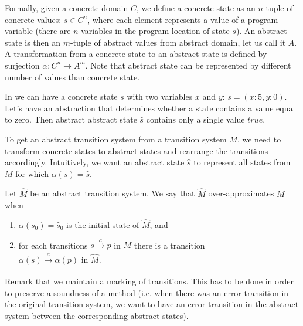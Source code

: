 Formally, given a concrete domain $C$, we define a concrete state as an $n$-tuple of concrete values:
$s \in C^n$, where each element represents a value of a program variable (there
are $n$ variables in the program location of state $s$). An abstract state is
then an $m$-tuple of abstract values from abstract domain, let us call it $A$. A
transformation from a concrete state to an abstract state is defined by
surjection $\alpha \colon C^n \rightarrow A^m$.  Note that abstract state can be
represented by different number of values than concrete state.
\begin{example}
In \LLVM we can have a concrete state $s$ with two variables $x$
and $y$: $s = (x:5,y:0)$. Let's have an abstraction that determines whether a state
contains a value equal to zero. Then abstract abstract state $\widehat{s}$ contains only
a single value $true$.
\end{example}

To get an abstract transition system from a transition system $M$, we need to
transform concrete states to abstract states and rearrange the transitions
accordingly. Intuitively, we want an abstract state $\widehat{s}$ to represent
all states from $M$ for which $\alpha(s) = \widehat{s}$.

\begin{definition}\label{def:am}
    Let $\widehat{M}$ be an abstract transition system. We say that $\widehat{M}$
    over-approximates $M$ when
    \begin{enumerate}
        \item $\alpha(s_0) = \widehat{s}_0$ is the initial state of $\widehat{M}$, and
        \item for each transitions $s \xrightarrow[]{a} p$ in $M$  there is a
            transition\\$\alpha(s) \xrightarrow[]{a} \alpha(p)$ in $\widehat{M}$.
    \end{enumerate}
\end{definition}
Remark that we maintain a marking of transitions. This has to be done in order
to preserve a soundness of a method (i.e. when there was an error transition in
the original transition system, we want to have an error transition in the
abstract system between the corresponding abstract states).

